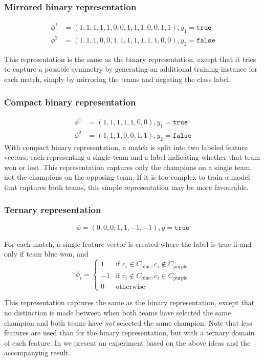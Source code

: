 \subsubsection{Mirrored binary representation}

\begin{align*}
  \phi^1 &= (1,1,1,1,1,0,0,1,1,1,0,0,1,1), y_1 = \texttt{true}\\
  \phi^2 &= (1,1,1,0,0,1,1,1,1,1,1,1,0,0), y_2 = \texttt{false}
\end{align*}

This representation is the same as the binary representation, except that it tries to capture a possible symmetry by generating an additional training instance for each match, simply by mirroring the teams and negating the class label.

\subsubsection{Compact binary representation}
\begin{align*}
  \phi^1 &= (1,1,1,1,1,0,0), y_1 = \mathtt{true} \\
  \phi^2 &= (1,1,1,0,0,1,1), y_2 = \mathtt{false}
\end{align*}
With compact binary representation, a match is split into two labeled feature vectors, each representing a single team and a label indicating whether that team won or lost.
This representation captures only the champions on a single team, not the champions on the opposing team.
If it is too complex to train a model that captures both teams, this simple representation may be more favourable.

\subsubsection{Ternary representation}

\[\phi = (0,0,0,1,1,-1,-1), y = \mathtt{true}\]

For each match, a single feature vector is created where the label is true if and only if team blue won, and
\[
    \phi_i = 
\begin{cases}
  1  & \text{if } c_i \in C_\text{blue}, c_i \not\in C_\text{purple}\\
  -1 & \text{if } c_i \not\in C_\text{blue}, c_i \in C_\text{purple}\\
  0  & \text{otherwise}
\end{cases}
\]

This representation captures the same as the binary representation, except that no distinction is made between when both teams have selected the same champion and both teams have \emph{not} selected the same champion.
Note that less features are used than for the binary representation, but with a ternary domain of each feature. In  we present an experiment based on the above ideas and the accompanying result.


